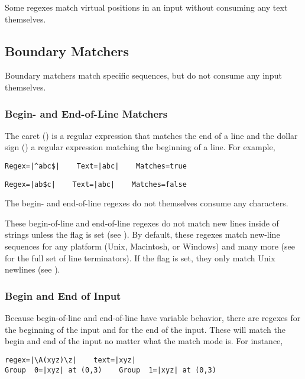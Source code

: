 Some regexes match virtual positions in an input without consuming any
text themselves.  

\subsection{Boundary Matchers}

Boundary matchers match specific sequences, but do not consume any
input themselves.  

\subsubsection{Begin- and End-of-Line Matchers}

The caret (\code{\^{}}) is a regular expression that matches the end
of a line and the dollar sign (\code{\$}) a regular expression
matching the beginning of a line.  For example, 
%
\begin{verbatim}
Regex=|^abc$|    Text=|abc|    Matches=true
\end{verbatim}
%
\begin{verbatim}
Regex=|ab$c|    Text=|abc|    Matches=false
\end{verbatim}
%
The begin- and end-of-line regexes do not themselves consume any
characters.

These begin-of-line and end-of-line regexes do not match new lines
inside of strings unless the  flag is set (see
).  By default, these regexes match new-line
sequences for any platform (Unix, Macintosh, or Windows) and many more
(see  for the full set of line terminators).  If
the
 flag is set, they only match Unix newlines (see
).

\subsubsection{Begin and End of Input}

Because begin-of-line and end-of-line have variable behavior, there
are regexes  for the beginning of the input and
 for the end of the input.  These will match the begin
and end of the input no matter what the match mode is.  For
instance,
%
\begin{verbatim}
regex=|\A(xyz)\z|    text=|xyz|
Group  0=|xyz| at (0,3)    Group  1=|xyz| at (0,3)
\end{verbatim}
%

